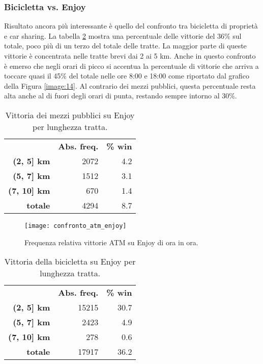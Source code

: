 \subsubsection{Bicicletta vs. Enjoy}

Risultato ancora più interessante è quello del confronto tra bicicletta di proprietà e car sharing. La tabella \ref{table:6} mostra una percentuale delle vittorie del 36\% sul totale, poco più di un terzo del totale delle tratte. La maggior parte di queste vittorie è concentrata nelle tratte brevi dai 2 ai 5 km. Anche in questo confronto è emerso che negli orari di picco si accentua la percentuale di vittorie che arriva a toccare quasi il 45\% del totale nelle ore 8:00 e 18:00 come riportato dal grafico della Figura \ref{image:14}. Al contrario dei mezzi pubblici, questa percentuale resta alta anche al di fuori degli orari di punta, restando sempre intorno al 30\%.

\begin{table}[H]
	\centering
	\begin{tabular}{ | r r r | }
		\hline
		& \textbf{Abs. freq.} & \textbf{\% win} \\
		\textbf{(2, 5] km} & 2072 & 4.2 \\
		\textbf{(5, 7] km} & 1512 & 3.1 \\
		\textbf{(7, 10] km} & 670 & 1.4 \\
		\hline
		\textbf{totale} & 4294 & 8.7 \\
		\hline
	\end{tabular}
	\caption{Vittoria dei mezzi pubblici su Enjoy per lunghezza tratta.}
	\label{table:5}
\end{table}

\begin{figure}[H]
	\centering
	\texttt{[image: confronto\_atm\_enjoy]}
	\caption{Frequenza relativa vittorie ATM su Enjoy di ora in ora.}
	\label{image:13}
\end{figure}

\pagebreak

\begin{table}[H]
	\centering
	\begin{tabular}{ | r r r | }
		\hline
		& \textbf{Abs. freq.} & \textbf{\% win} \\
		\textbf{(2, 5] km} & 15215 & 30.7 \\
		\textbf{(5, 7] km} & 2423 & 4.9 \\
		\textbf{(7, 10] km} & 278 & 0.6 \\
		\hline
		\textbf{totale} & 17917 & 36.2 \\
		\hline
	\end{tabular}
	\caption{Vittoria della bicicletta su Enjoy per lunghezza tratta.}
	\label{table:6}
\end{table}

